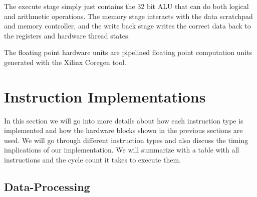 The execute stage simply just contains the 32 bit ALU that can do both logical and arithmetic operations. 
The memory stage interacts with the data scratchpad and memory controller, and the write back stage writes the correct data back to the registers and hardware thread states.

The floating point hardware units are pipelined floating point computation units generated with the Xilinx Coregen tool. 
 
\section{Instruction Implementations}
In this section we will go into more details about how each instruction type is implemented and how the hardware blocks shown in the previous sections are used.
We will go through different instruction types and also discuss the timing implications of our implementation. 
We will summarize with a table with all instructions and the cycle count it takes to execute them.   
\subsection{Data-Processing}

